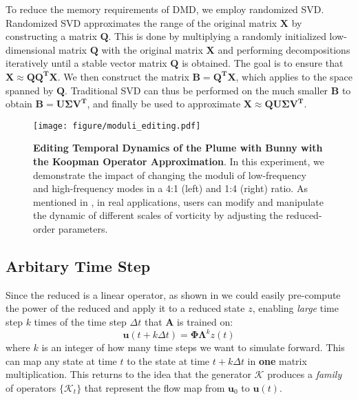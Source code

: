 To reduce the memory requirements of DMD, we employ randomized SVD. Randomized SVD approximates the range of the original matrix $\bm{X}$ by constructing a matrix $\bm{Q}$. This is done by multiplying a randomly initialized low-dimensional matrix $\bm{Q}$ with the original matrix $\bm{X}$ and performing decompositions iteratively until a stable vector matrix $\bm{Q}$ is obtained. The goal is to ensure that  $\bm{X} \approx \bm{Q}\bm{Q^T} \bm{X}$. We then construct the matrix  $\bm{B} = \bm{Q^T} \bm{X}$, which applies to the space spanned by $\bm{Q}$. Traditional SVD can thus be performed on the much smaller $\bm{B}$ to obtain  $\bm{B} = \bm{U} \bm{\Sigma} \bm{V^T}$, and finally be used to approximate $\bm{X} \approx \bm{Q} \bm{U} \bm{\Sigma} \bm{V^T}$.

\begin{figure}[!ht]
    \centering
    \texttt{[image: figure/moduli\_editing.pdf]}
    \caption{\textbf{Editing Temporal Dynamics of the Plume with Bunny with the Koopman Operator Approximation}. In this experiment, we demonstrate the impact of changing the moduli of low-frequency and high-frequency modes in a 4:1 (left) and 1:4 (right) ratio. As mentioned in , in real applications, users can modify and manipulate the dynamic of different scales of vorticity by adjusting the reduced-order parameters.}
    \label{fig:bunny_editing}
    \Description{}
\end{figure}

\subsection{Arbitary Time Step}
Since the reduced \koopman{} is a linear operator, as shown in  we could easily pre-compute the power of the reduced \koopman{} and apply it to a reduced state $z$, enabling \textit{large} time step $k$ times of the time step $\Delta t$ that $\bm A$ is trained on:
\begin{equation}
    \label{eqn:large_time_step}
    \bm{u}(t + k\Delta t) = \bm{\Phi} \bm{\Lambda}^k z(t)
\end{equation}
where $k$ is an integer of how many time steps we want to simulate forward. This can map any state at time $t$ to the state at time $t + k\Delta t$ in \textbf{one} matrix multiplication. This returns to the idea that the generator $\bm{\mathcal{K}}$ produces a \emph{family} of operators $\{\bm{\mathcal{K}}_t\}$ that represent the flow map from $\bm{u}_0$ to $\bm{u}(t)$.

